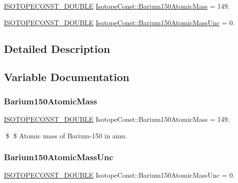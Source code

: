 \begin{DoxyCompactItemize}
\item 
\mbox{\hyperlink{group___isotope_const-_macros_ga8f45a7272ce02c0b4c65c44636ed719a}{I\+S\+O\+T\+O\+P\+E\+C\+O\+N\+S\+T\+\_\+\+D\+O\+U\+B\+LE}} \mbox{\hyperlink{group___isotope_const-_barium-_ba150_ga84eeec38d5772042a7f80097357afbf0}{Isotope\+Const\+::\+Barium150\+Atomic\+Mass}} = 149.
\item 
\mbox{\hyperlink{group___isotope_const-_macros_ga8f45a7272ce02c0b4c65c44636ed719a}{I\+S\+O\+T\+O\+P\+E\+C\+O\+N\+S\+T\+\_\+\+D\+O\+U\+B\+LE}} \mbox{\hyperlink{group___isotope_const-_barium-_ba150_ga20908a121a2c0173599e18f26a4e6674}{Isotope\+Const\+::\+Barium150\+Atomic\+Mass\+Unc}} = 0.
\end{DoxyCompactItemize}


\subsection{Detailed Description}


\subsection{Variable Documentation}
\mbox{\label{group___isotope_const-_barium-_ba150_ga84eeec38d5772042a7f80097357afbf0}} 
\subsubsection{\texorpdfstring{Barium150\+Atomic\+Mass}{Barium150AtomicMass}}
{\footnotesize\ttfamily \mbox{\hyperlink{group___isotope_const-_macros_ga8f45a7272ce02c0b4c65c44636ed719a}{I\+S\+O\+T\+O\+P\+E\+C\+O\+N\+S\+T\+\_\+\+D\+O\+U\+B\+LE}} Isotope\+Const\+::\+Barium150\+Atomic\+Mass = 149.}

\$ \$ Atomic mass of Barium-\/150 in amu. \mbox{\label{group___isotope_const-_barium-_ba150_ga20908a121a2c0173599e18f26a4e6674}} 
\subsubsection{\texorpdfstring{Barium150\+Atomic\+Mass\+Unc}{Barium150AtomicMassUnc}}
{\footnotesize\ttfamily \mbox{\hyperlink{group___isotope_const-_macros_ga8f45a7272ce02c0b4c65c44636ed719a}{I\+S\+O\+T\+O\+P\+E\+C\+O\+N\+S\+T\+\_\+\+D\+O\+U\+B\+LE}} Isotope\+Const\+::\+Barium150\+Atomic\+Mass\+Unc = 0.}

